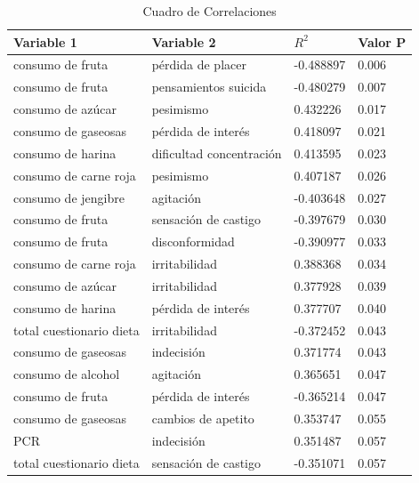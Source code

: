 \documentclass[man]{apa7}
\begin{document}
\begin{table}[H]
	\begin{tabular}{@{}llll@{}}
	\toprule
	\textbf{Variable 1}      & \textbf{Variable 2}      & \textbf{$R^2$}       & \textbf{Valor P} \\ \midrule
	consumo de fruta         & pérdida de placer        & -0.488897            & 0.006   \\
	consumo de fruta         & pensamientos suicida     & -0.480279            & 0.007   \\
	consumo de azúcar        & pesimismo                & 0.432226             & 0.017   \\
	consumo de gaseosas      & pérdida de interés       & 0.418097             & 0.021   \\
	consumo de harina        & dificultad concentración & 0.413595             & 0.023   \\
	consumo de carne roja    & pesimismo                & 0.407187             & 0.026   \\
	consumo de jengibre      & agitación                & -0.403648            & 0.027   \\
	consumo de fruta         & sensación de castigo     & -0.397679            & 0.030   \\
	consumo de fruta         & disconformidad           & -0.390977            & 0.033   \\
	consumo de carne roja    & irritabilidad            & 0.388368             & 0.034   \\
	consumo de azúcar        & irritabilidad            & 0.377928             & 0.039   \\
	consumo de harina        & pérdida de interés       & 0.377707             & 0.040   \\
	total cuestionario dieta & irritabilidad            & -0.372452            & 0.043   \\
	consumo de gaseosas      & indecisión               & 0.371774             & 0.043   \\
	consumo de alcohol       & agitación                & 0.365651             & 0.047   \\
	consumo de fruta         & pérdida de interés       & -0.365214            & 0.047   \\
	consumo de gaseosas      & cambios de apetito       & 0.353747             & 0.055   \\
	PCR                      & indecisión               & 0.351487             & 0.057   \\
	total cuestionario dieta & sensación de castigo     & -0.351071            & 0.057   \\ \bottomrule
	\end{tabular}%
	\caption{Cuadro de Correlaciones}
	\label{tab:tableOfCorr}
	\end{table}
\end{document}
